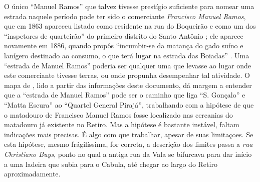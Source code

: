 O único ``Manuel Ramos'' que talvez tivesse prestígio suficiente para nomear uma estrada naquele período pode ter sido o comerciante \textit{Francisco Manuel Ramos}, que em 1863 apareceu listado como residente na rua do Boqueirão e como um dos ``inspetores de quarteirão'' do primeiro distrito do Santo Antônio \cite[p.~258]{masson_almanak_1863}; ele aparece novamente em 1886, quando propôs ``incumbir-se da matança do gado suíno e lanígero destinado ao consumo, o que terá lugar na estrada das Boiadas'' \cite[p.~88]{bahia_relatassleg2_1886}. Uma ``estrada de Manuel Ramos'' poderia ser qualquer uma que levasse ao lugar onde este comerciante tivesse terras, ou onde propunha desempenhar tal atividade. O mapa de , lido a partir das informações deste documento, dá margem a entender que a ``estrada de Manuel Ramos'' pode ser o caminho que liga ``S. Gonçalo'' e ``Matta Escura'' ao ``Quartel General Pirajá'', trabalhando com a hipótese de que o matadouro de Francisco Manuel Ramos fosse localizado nas cercanias do matadouro já existente no Retiro. Mas a hipótese é bastante instável, faltam indicações mais precisas. É algo com que trabalhar, apesar de suas limitaçoes. Se esta hipótese, mesmo frágilíssima, for correta, a descrição dos limites passa a \textit{rua Christiano Buys}, ponto no qual a antiga rua da Vala se bifurcava para dar início a uma ladeira que subia para o Cabula, até chegar ao largo do Retiro aproximadamente.

